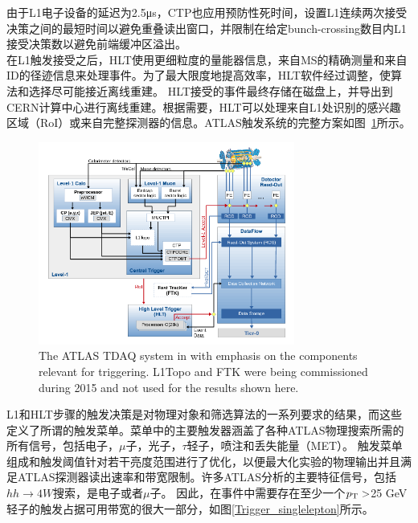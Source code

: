 由于L1电子设备的延迟为2.5μs，CTP也应用预防性死时间，设置L1连续两次接受决策之间的最短时间以避免重叠读出窗口，并限制在给定bunch-crossing数目内L1接受决策数以避免前端缓冲区溢出。\\
在L1触发接受之后，HLT使用更细粒度的量能器信息，来自MS的精确测量和来自ID的径迹信息来处理事件。为了最大限度地提高效率，HLT软件经过调整，使算法和选择尽可能接近离线重建。
HLT接受的事件最终存储在磁盘上，并导出到CERN计算中心进行离线重建。根据需要，HLT可以处理来自L1处识别的感兴趣区域（RoI）或来自完整探测器的信息。ATLAS触发系统的完整方案如图~\ref{fig:ATLAS_TDAQ}所示。
\begin{figure}[h]
\begin{center}
\includegraphics[width=0.75\textwidth]{fig/content_tdaq_figures_tdaq-run2-schematic.png}
\caption{The ATLAS TDAQ system in \RunTwo with emphasis on the components relevant for triggering. L1Topo and FTK were being commissioned during 2015 and not used for the results shown here.~\cite{Aaboud2017}} \label{fig:ATLAS_TDAQ}
\end{center}
\end{figure}
L1和HLT步骤的触发决策是对物理对象和筛选算法的一系列要求的结果，而这些定义了所谓的触发菜单。菜单中的主要触发器涵盖了各种ATLAS物理搜索所需的所有信号，包括电子，$\mu$子，光子，$\tau$轻子，喷注和丢失能量（MET）。
触发菜单组成和触发阈值针对若干亮度范围进行了优化，以便最大化实验的物理输出并且满足ATLAS探测器读出速率和带宽限制。许多ATLAS分析的主要特征信号，包括$hh\rightarrow 4W$搜索，是电子或者$\mu$子。 因此，在事件中需要存在至少一个$p_{\text{T}}>$25 GeV轻子的触发占据可用带宽的很大一部分，如图\ref{Trigger_singlelepton}所示。
